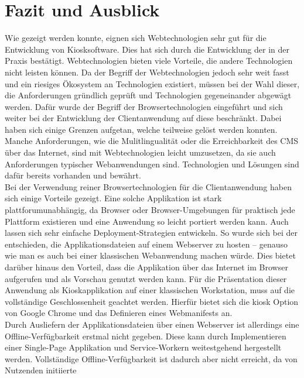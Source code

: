 \chapter{Fazit und Ausblick}
\label{chap:fazit}

Wie gezeigt werden konnte, eignen sich Webtechnologien sehr gut für
die Entwicklung von Kiosksoftware. Dies hat sich durch die Entwicklung
der \shst{} in der Praxis bestätigt. Webtechnologien bieten viele Vorteile, die andere
Technologien nicht leisten können. Da der Begriff der Webtechnologien jedoch
sehr weit fasst und ein riesiges Ökosystem an Technologien existiert, müssen bei
der Wahl dieser, die Anforderungen gründlich geprüft und Technologien gegeneinander 
abgewägt werden. Dafür wurde der Begriff der Browsertechnologien eingeführt und sich
weiter bei der Entwicklung der Clientanwendung auf diese beschränkt. 
Dabei haben sich einige Grenzen aufgetan, welche teilweise gelöst werden konnten.\\
Manche Anforderungen, wie die Mulitlingualität oder die Erreichbarkeit des CMS über das Internet,
sind mit Webtechnologien leicht umzusetzen, da sie auch Anforderungen typischer Webanwendungen sind.
Technologien und Lösungen sind dafür bereits vorhanden und bewährt.\\
Bei der Verwendung reiner Browsertechnologien für die Clientanwendung haben sich einige Vorteile 
gezeigt. Eine solche Applikation ist stark plattforumunabhängig, da Browser oder Browser-Umgebungen
für praktisch jede Plattform existieren und eine Anwendung so leicht portiert werden kann. Auch lassen
sich sehr einfache Deployment-Strategien entwickeln. So wurde sich bei der \shst{} entschieden, die
Applikationsdateien auf einem Webserver zu hosten -- genauso wie man es auch bei einer klassischen %
Webanwendung machen würde. Dies bietet darüber hinaus den Vorteil, dass die Applikation über das Internet
im Browser aufgerufen und als Vorschau genutzt werden kann. Für die Präsentation dieser Anwendung als
Kioskapplikation auf einer klassischen Workstation, muss auf die vollständige Geschlossenheit geachtet werden.
Hierfür bietet sich die kiosk Option von Google Chrome und das Definieren eines Webmanifests an.\\
Durch Ausliefern der Applikationsdateien über einen Webserver ist allerdings eine Offline-Verfügbarkeit
erstmal nicht gegeben. Diese kann durch Implementieren einer Single-Page Applikation und 
Service-Workern weitestgehend hergestellt werden.
Vollständige Offline-Verfügbarkeit ist dadurch aber nicht erreicht, da von Nutzenden initiierte
